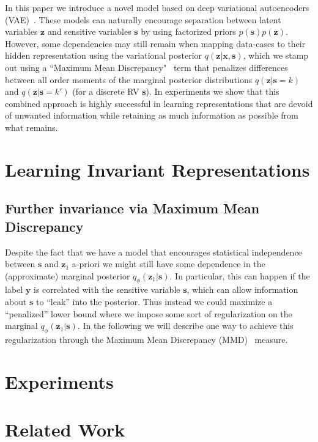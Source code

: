 \documentclass{article} %
\def\*#1{\mathbf{#1}}
\begin{document}
In this paper we introduce a novel model based on deep variational autoencoders (VAE)~\citep{kingma2013auto, rezende2014stochastic}. These models can naturally encourage separation between latent variables $\*z$ and sensitive variables $\*s$ by using factorized priors $p(\*s)p(\*z)$. However, some dependencies may still remain when mapping data-cases to their hidden representation using the variational posterior $q(\*z|\*x,\*s)$, which we stamp out using a ``Maximum Mean Discrepancy"~\citep{gretton2006kernel} term that penalizes differences between all order moments of the marginal posterior distributions $q(\*z|\*s=k)$ and $q(\*z|\*s=k')$ (for a discrete RV $\*s$). In experiments we show that this combined approach is highly successful in learning representations that are devoid of unwanted information while retaining as much information as possible from what remains. 

\section{Learning Invariant Representations}


\subsection{Further invariance via Maximum Mean Discrepancy}
Despite the fact that we have a model that encourages statistical independence between $\*s$ and $\*z_1$ a-priori we might still have some dependence in the (approximate) marginal posterior $q_{\phi}(\*z_1|\*s)$. In particular, this can happen if the label $\*y$ is correlated with the sensitive variable $\*s$, which can allow information about $\*s$ to ``leak'' into the posterior. Thus instead we could maximize a ``penalized'' lower bound where we impose some sort of regularization on the marginal $q_{\phi}(\*z_1|\*s)$. In the following we will describe one way to achieve this regularization through the Maximum Mean Discrepancy (MMD)~\citep{gretton2006kernel} measure.

 


\section{Experiments}


\section{Related Work}

\end{document}
